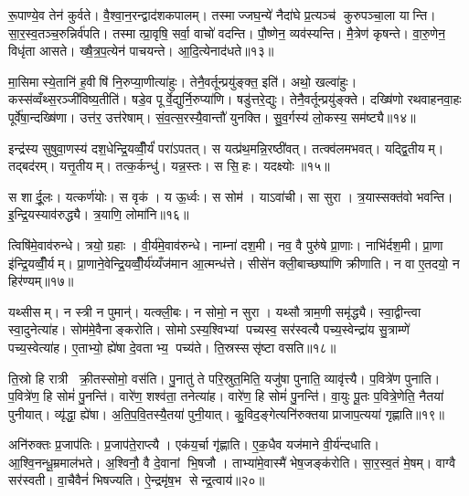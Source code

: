 रू॒पाण्ये॒व तेन॑ कुर्वते। वै॒श्वा॒न॒रन्द्वाद॑शकपालम्। तस्माज्जघ॒न्ये॑ नैदा॑घे प्र॒त्यञ्च॑ कुरुपञ्चा॒ला यान्ति। सा॒र॒स्व॒तञ्च॒रुन्निर्व॑पति। तस्मात्प्रा॒वृषि॒ सर्वा॒ वाचो॑ वदन्ति। पौ॒ष्णेन॒ व्यव॑स्यन्ति। मै॒त्रेण॑ कृषन्ते। वा॒रु॒णेन॒ विधृ॑ता आसते। ख्षै॒त्र॒प॒त्येन॑ पाचयन्ते। आ॒दि॒त्येनाद॑धते॥१३॥

मा॒सिमास्ये॒तानि॑ ह॒वीषि॑ नि॒रुप्या॒णीत्या॑हुः। तेनै॒वर्तून्प्रयु॑ङ्क्त॒ इति॑। अथो॒ खल्वा॑हुः। कस्स॑व्वँथ्स॒रञ्जी॑विष्य॒तीति॑। षडे॒व पूर्वे॒द्युर्नि॒रुप्या॑णि। षडु॑त्तरे॒द्युः। तेनै॒वर्तून्प्रयु॑ङ्क्ते। दख्षि॑णो रथवाहनवा॒हः पूर्वे॑षा॒न्दख्षि॑णा। उत्त॑र॒ उत्त॑रेषाम्। सं॒व॒त्स॒रस्यै॒वान्तौ॑ युनक्ति। सु॒व॒र्गस्य॑ लो॒कस्य॒ सम॑ष्ट्यै॥१४॥\anuvakamend[त्वा॒ष्ट्रम॒ष्टाक॑पालन्दधते युन॒क्त्येक॑ञ्च]

इन्द्र॑स्य सुषुवा॒णस्य॑ दश॒धेन्द्रि॒यव्वीँ॒र्यं॑ परा॑ऽपतत्। स यत्प्र॑थ॒मन्नि॒रष्ठी॑वत्। तत्क्व॑लमभवत्। यद्द्वि॒तीयम्। तद्बद॑रम्। यत्तृ॒तीयम्। तत्क॒र्कन्धु॑। यन्न॒स्तः। स सि॒हः। यदक्ष्योः॥१५॥

स शार्दू॒लः। यत्कर्ण॑योः। स वृक॑। य ऊ॒र्ध्वः। स सोम॑। याऽवा॑ची। सा सुरा। त्र॒यास्सक्त॑वो भवन्ति। इ॒न्द्रि॒यस्याव॑रुद्ध्यै। त्र॒याणि॒ लोमा॑नि॥१६॥

त्विषि॑मे॒वाव॑रुन्धे। त्रयो॒ ग्रहाः। वी॒र्य॑मे॒वाव॑रुन्धे। नाम्ना॑ दश॒मी। नव॒ वै पुरु॑षे प्रा॒णाः। नाभि॑र्दश॒मी। प्रा॒णा इ॑न्द्रि॒यव्वीँ॒र्यम्। प्रा॒णाने॒वेन्द्रि॒यव्वीँ॒र्य॑य्यँज॑मान आ॒त्मन्ध॑त्ते। सीसे॑न क्ली॒बाच्छष्पा॑णि क्रीणाति। न वा ए॒तदयो॒ न हिर॑ण्यम्॥१७॥

यथ्सीसम्। न स्त्री न पुमान्॑। यत्क्ली॒बः। न सोमो॒ न सुरा। यथ्सौत्राम॒णी समृ॑द्ध्यै। स्वा॒द्वीन्त्वा स्वा॒दुनेत्या॑ह। सोम॑मे॒वैनाङ्करोति। सोमोऽस्य॒श्विभ्यां पच्यस्व॒ सर॑स्वत्यै पच्य॒स्वेन्द्रा॑य सु॒त्राम्णे॑ पच्य॒स्वेत्या॑ह। ए॒ताभ्यो॒ ह्ये॑षा दे॒वताभ्य॒ पच्य॑ते। ति॒स्रस्ससृ॑ष्टा वसति॥१८॥

ति॒स्रो हि रात्री क्री॒तस्सोमो॒ वस॑ति। पु॒नातु॑ ते परि॒स्रुत॒मिति॒ यजु॑षा पुनाति॒ व्यावृ॑त्त्यै। प॒वित्रे॑ण पुनाति। प॒वित्रे॑ण॒ हि सोमं॑ पु॒नन्ति॑। वारे॑ण॒ शश्व॑ता॒ तनेत्या॑ह। वारे॑ण॒ हि सोमं॑ पु॒नन्ति॑। वा॒युः पू॒तः प॒वित्रे॒णेति॒ नैतया॑ पुनीयात्। व्यृ॑द्धा॒ ह्ये॑षा। अ॒ति॒प॒वि॒तस्यै॒तया॑ पुनी॒यात्। कु॒विद॒ङ्गेत्यनि॑रुक्तया प्राजाप॒त्यया॑ गृह्णाति॥१९॥

अनि॑रुक्तः प्र॒जाप॑तिः। प्र॒जाप॑ते॒राप्त्यै। एक॑य॒र्चा गृ॑ह्णाति। ए॒क॒धैव यज॑माने वी॒र्य॑न्दधाति। आ॒श्वि॒नन्धू॒म्रमाल॑भते। अ॒श्विनौ॒ वै दे॒वानां भि॒षजौ। ताभ्या॑मे॒वास्मै॑ भेष॒जङ्क॑रोति। सा॒र॒स्व॒तं मे॒षम्। वाग्वै सर॑स्वती। वा॒चैवैनं॑ भिषज्यति। ऐ॒न्द्रमृ॑ष॒भ सेन्द्र॒त्वाय॑॥२०॥\anuvakamend[अक्ष्यो॒र्लोमा॑नि॒ हिर॑ण्यव्वँसति गृह्णाति भिषज्य॒त्येक॑ञ्च]


